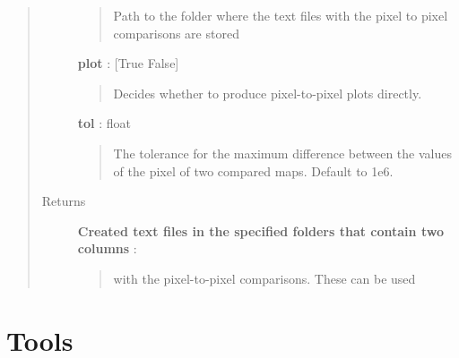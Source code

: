 \documentclass[a4paper,10pt,english]{sphinxmanual}
\begin{document}
\begin{fulllineitems}
\begin{fulllineitems}
\begin{quote}
\begin{description}
\begin{quote}
Path to the folder where the text files with the pixel
to pixel comparisons are stored
\end{quote}

\textbf{plot} : {[}True \textbar{} False{]}
\begin{quote}

Decides whether to produce pixel-to-pixel plots directly.
\end{quote}

\textbf{tol} : float
\begin{quote}

The tolerance for the maximum difference between the
values of the pixel of two compared maps. Default to 1e6.
\end{quote}

\item[{Returns }] \leavevmode
\textbf{Created text files in the specified folders that contain two columns} :
\begin{quote}

with the pixel-to-pixel comparisons. These can be used
\end{quote}

\end{description}\end{quote}

\end{fulllineitems}


\end{fulllineitems}



\section{Tools}
\label{maps:module-astrolyze.maps.tools}\label{maps:tools}
\end{document}
